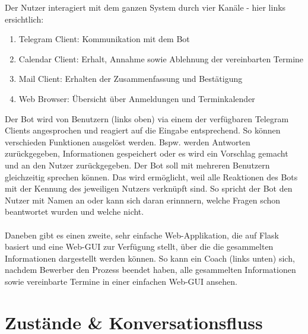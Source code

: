 	Der Nutzer interagiert mit dem ganzen System durch vier Kanäle - hier links ersichtlich:
	\begin{enumerate}
		\item Telegram Client: Kommunikation mit dem Bot
		\item Calendar Client: Erhalt, Annahme sowie Ablehnung der vereinbarten Termine
		\item Mail Client: Erhalten der Zusammenfassung und Bestätigung
		\item Web Browser: Übersicht über Anmeldungen und Terminkalender
	\end{enumerate}

	Der Bot wird von Benutzern (links oben) via einem der verfügbaren Telegram Clients angesprochen und reagiert auf die Eingabe entsprechend. So können verschieden Funktionen ausgelöst werden. Bspw. werden Antworten zurückgegeben, Informationen gespeichert oder es wird ein Vorschlag gemacht und an den Nutzer zurückgegeben. Der Bot soll mit mehreren Benutzern gleichzeitig sprechen können. Das wird ermöglicht, weil alle Reaktionen des Bots mit der Kennung des jeweiligen Nutzers verknüpft sind. So spricht der Bot den Nutzer mit Namen an oder kann sich daran erinnnern, welche Fragen schon beantwortet wurden und welche nicht. \\ \\

	Daneben gibt es einen zweite, sehr einfache Web-Applikation, die auf Flask basiert und eine Web-GUI zur Verfügung stellt, über die die gesammelten Informationen dargestellt werden können. So kann ein Coach (links unten) sich, nachdem Bewerber den Prozess beendet haben, alle gesammelten Informationen sowie vereinbarte Termine in einer einfachen Web-GUI ansehen.

\section{Zustände \& Konversationsfluss}


